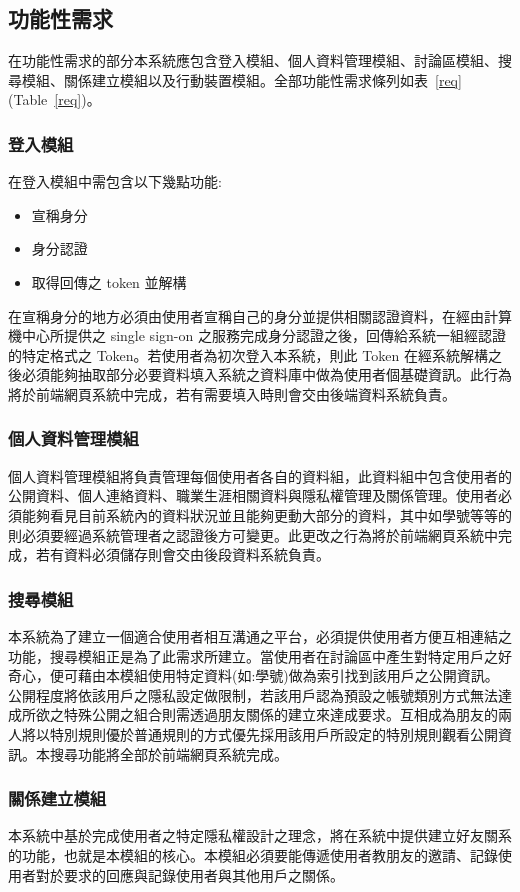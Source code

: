 \documentclass[11pt]{article}
\begin{document}
\subsection{功能性需求}
在功能性需求的部分本系統應包含登入模組、個人資料管理模組、討論區模組、搜尋模組、關係建立模組以及行動裝置模組。全部功能性需求條列如表~\ref{req} (Table~\ref{req})。
\subsubsection{登入模組}
在登入模組中需包含以下幾點功能: 
\begin{itemize}
\item{宣稱身分}
\item{身分認證}
\item{取得回傳之 token 並解構}
\end{itemize}
在宣稱身分的地方必須由使用者宣稱自己的身分並提供相關認證資料，在經由計算機中心所提供之 single sign-on 之服務完成身分認證之後，回傳給系統一組經認證的特定格式之 Token。若使用者為初次登入本系統，則此 Token 在經系統解構之後必須能夠抽取部分必要資料填入系統之資料庫中做為使用者個基礎資訊。此行為將於前端網頁系統中完成，若有需要填入時則會交由後端資料系統負責。
\subsubsection{個人資料管理模組}
個人資料管理模組將負責管理每個使用者各自的資料組，此資料組中包含使用者的公開資料、個人連絡資料、職業生涯相關資料與隱私權管理及關係管理。使用者必須能夠看見目前系統內的資料狀況並且能夠更動大部分的資料，其中如學號等等的則必須要經過系統管理者之認證後方可變更。此更改之行為將於前端網頁系統中完成，若有資料必須儲存則會交由後段資料系統負責。
\subsubsection{搜尋模組}
本系統為了建立一個適合使用者相互溝通之平台，必須提供使用者方便互相連結之功能，搜尋模組正是為了此需求所建立。當使用者在討論區中產生對特定用戶之好奇心，便可藉由本模組使用特定資料(如:學號)做為索引找到該用戶之公開資訊。公開程度將依該用戶之隱私設定做限制，若該用戶認為預設之帳號類別方式無法達成所欲之特殊公開之組合則需透過朋友關係的建立來達成要求。互相成為朋友的兩人將以特別規則優於普通規則的方式優先採用該用戶所設定的特別規則觀看公開資訊。本搜尋功能將全部於前端網頁系統完成。
\subsubsection{關係建立模組}
本系統中基於完成使用者之特定隱私權設計之理念，將在系統中提供建立好友關系的功能，也就是本模組的核心。本模組必須要能傳遞使用者教朋友的邀請、記錄使用者對於要求的回應與記錄使用者與其他用戶之關係。%
\end{document}
